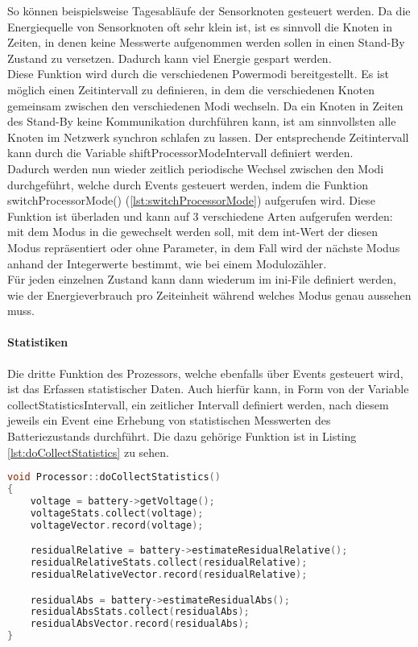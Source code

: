 So können beispielsweise Tagesabläufe der Sensorknoten gesteuert werden. Da die Energiequelle von Sensorknoten oft sehr klein ist, ist es sinnvoll die Knoten in Zeiten, in denen keine Messwerte aufgenommen werden sollen in einen Stand-By Zustand zu versetzen. Dadurch kann viel Energie gespart werden.\\
Diese Funktion wird durch die verschiedenen Powermodi bereitgestellt. Es ist möglich einen Zeitintervall zu definieren, in dem die verschiedenen Knoten gemeinsam zwischen den verschiedenen Modi wechseln. Da ein Knoten in Zeiten des Stand-By keine Kommunikation durchführen kann, ist am sinnvollsten alle Knoten im Netzwerk synchron schlafen zu lassen. Der entsprechende Zeitintervall kann durch die Variable shiftProcessorModeIntervall definiert werden.\\
Dadurch werden nun wieder zeitlich periodische Wechsel zwischen den Modi durchgeführt, welche durch Events gesteuert werden, indem die Funktion switchProcessorMode() (\ref{lst:switchProcessorMode}) aufgerufen wird. Diese Funktion ist überladen und kann auf 3 verschiedene Arten aufgerufen werden: mit dem Modus in die gewechselt werden soll, mit dem int-Wert der diesen Modus repräsentiert oder ohne Parameter, in dem Fall wird der nächste Modus anhand der Integerwerte bestimmt, wie bei einem Modulozähler.\\
Für jeden einzelnen Zustand kann dann wiederum im ini-File definiert werden, wie der Energieverbrauch pro Zeiteinheit während welches Modus genau aussehen muss.

\paragraph{Statistiken}

Die dritte Funktion des Prozessors, welche ebenfalls über Events gesteuert wird, ist das Erfassen statistischer Daten. Auch hierfür kann, in Form von der Variable collectStatisticsIntervall, ein zeitlicher Intervall definiert werden, nach diesem jeweils ein Event eine Erhebung von statistischen Messwerten des Batteriezustands durchführt. Die dazu gehörige Funktion ist in Listing \ref{lst:doCollectStatistics} zu sehen.

\begin{lstlisting}[language=C++, label=lst:doCollectStatistics, caption=doCollectStatistics()]
void Processor::doCollectStatistics()
{
    voltage = battery->getVoltage();
    voltageStats.collect(voltage);
    voltageVector.record(voltage);

    residualRelative = battery->estimateResidualRelative();
    residualRelativeStats.collect(residualRelative);
    residualRelativeVector.record(residualRelative);

    residualAbs = battery->estimateResidualAbs();
    residualAbsStats.collect(residualAbs);
    residualAbsVector.record(residualAbs);
}
\end{lstlisting}

